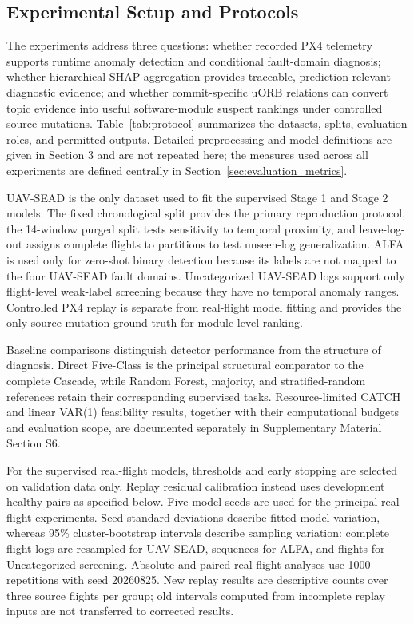 \subsection{Experimental Setup and Protocols}
\label{sec:experimental_protocols}

The experiments address three questions: whether recorded PX4 telemetry supports runtime anomaly detection and conditional fault-domain diagnosis; whether hierarchical SHAP aggregation provides traceable, prediction-relevant diagnostic evidence; and whether commit-specific uORB relations can convert topic evidence into useful software-module suspect rankings under controlled source mutations. Table~\ref{tab:protocol} summarizes the datasets, splits, evaluation roles, and permitted outputs. Detailed preprocessing and model definitions are given in Section 3 and are not repeated here; the measures used across all experiments are defined centrally in Section~\ref{sec:evaluation_metrics}.

UAV-SEAD is the only dataset used to fit the supervised Stage 1 and Stage 2 models. The fixed chronological split provides the primary reproduction protocol, the 14-window purged split tests sensitivity to temporal proximity, and leave-log-out assigns complete flights to partitions to test unseen-log generalization. ALFA is used only for zero-shot binary detection because its labels are not mapped to the four UAV-SEAD fault domains. Uncategorized UAV-SEAD logs support only flight-level weak-label screening because they have no temporal anomaly ranges. Controlled PX4 replay is separate from real-flight model fitting and provides the only source-mutation ground truth for module-level ranking.

Baseline comparisons distinguish detector performance from the structure of diagnosis. Direct Five-Class is the principal structural comparator to the complete Cascade, while Random Forest, majority, and stratified-random references retain their corresponding supervised tasks. Resource-limited CATCH and linear VAR(1) feasibility results, together with their computational budgets and evaluation scope, are documented separately in Supplementary Material Section S6.

For the supervised real-flight models, thresholds and early stopping are selected on validation data only. Replay residual calibration instead uses development healthy pairs as specified below. Five model seeds are used for the principal real-flight experiments. Seed standard deviations describe fitted-model variation, whereas 95\% cluster-bootstrap intervals describe sampling variation: complete flight logs are resampled for UAV-SEAD, sequences for ALFA, and flights for Uncategorized screening. Absolute and paired real-flight analyses use 1000 repetitions with seed 20260825. New replay results are descriptive counts over three source flights per group; old intervals computed from incomplete replay inputs are not transferred to corrected results.

